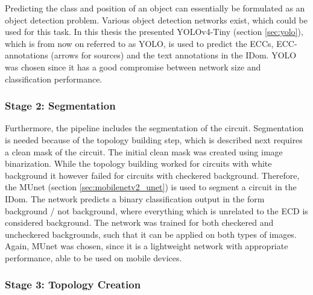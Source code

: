 Predicting the class and position of an object can essentially be formulated as an object detection problem.
Various object detection networks exist, which could be used for this task.
In this thesis the presented \ac{YOLOv4}-Tiny (section \ref{sec:yolo}), which is from now on referred to as \ac{YOLO}, is used to predict the \acp{ECC}, \ac{ECC}-annotations (arrows for sources) and the text annotations in the \ac{IDom}.
\ac{YOLO} was chosen since it has a good compromise between network size and classification performance.

\subsubsection{Stage 2: Segmentation}

Furthermore, the pipeline includes the segmentation of the circuit.
Segmentation is needed because of the topology building step, which is described next requires a clean mask of the circuit.
The initial clean mask was created using image binarization.
While the topology building worked for circuits with white background it however failed for circuits with checkered background.
Therefore, the \ac{MUnet} (section \ref{sec:mobilenetv2_unet}) is used to segment a circuit in the \ac{IDom}.
The network predicts a binary classification output in the form background / not background, where everything which is unrelated to the \ac{ECD} is considered background.
The network was trained for both checkered and uncheckered backgrounds, such that it can be applied on both types of images.
Again, \ac{MUnet} was chosen, since it is a lightweight network with appropriate performance, able to be used on mobile devices.


\subsubsection{Stage 3: Topology Creation}

